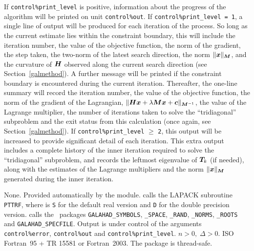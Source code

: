 \documentclass{galahad}
\newcommand{\packagename}{GL\-TR}
\begin{document}

\galinfo
If {\tt control\%print\_level} is positive, information about the progress
of the algorithm will be printed on unit {\tt control\-\%\-out}.
If {\tt control\%print\_level = 1}, a single line of output will be produced
for each iteration of the process. So long as the current estimate lies
within the constraint boundary, this will include
the iteration number, the value of the objective function, the
norm of the gradient, the step taken, the two-norm of the latest search
direction, the norm $\|{\bm{x}}\|_{{\bm{M}}}$, and the curvature of ${\bm{H}}$ observed
along the current search direction (see Section~\ref{galmethod}).
A further message will be printed
if the constraint boundary is encountered during the current iteration.
Thereafter, the one-line summary will record
the iteration number, the value of the objective function, the
norm of the gradient of the Lagrangian,
$\|{\bm{H}} {\bm{x}}  +  \lambda {\bm{M}} {\bm{x}}  +  {\bm{c}}\|_{{\bm{M}}^{-1}}$,
the value of the Lagrange multiplier, the
number of iterations taken to solve the ``tridiagonal'' subproblem
and the exit status from this calculation (once again, see
Section~\ref{galmethod}).
If {\tt control\%print\_level} $\geq$ {\tt 2}, this
output will be increased to provide significant detail of each iteration.
This extra output includes a complete history of the inner iteration required
to solve the ``tridiagonal'' subproblem, and records the leftmost eigenvalue
of ${\bm{T}}_k$ (if needed), along with the estimates of the Lagrange
multipliers and the norm $\|{\bm{x}}\|_{{\bm{M}}}$
generated during the inner iteration.


\galgeneral

\galcommon None.
\galworkspace Provided automatically by the module.
\galroutines {\tt \packagename\_solve} calls the LAPACK subroutine
{\tt *PTTRF}, where {\tt *} is {\tt S} for
the default real version and {\tt D} for the double precision version.
\galmodules {\tt \packagename\_solve} calls the \galahad\ packages
{\tt GALAHAD\_SY\-M\-BOLS},
{\tt \libraryname\_\-SPACE},
{\tt \libraryname\-\_\-RAND},
{\tt \libraryname\_\-NORMS},
{\tt \libraryname\_\-ROOTS} and
{\tt GALAHAD\_SPECFILE}.
\galio Output is under control of the arguments
{\tt control\%error}, {\tt control\%out} and {\tt control\%print\_level}.
\galrestrictions $n  >  0, \;  \Delta  >  0$.
\galportability ISO Fortran~95 + TR 15581 or Fortran~2003.
The package is thread-safe.
\end{document}
